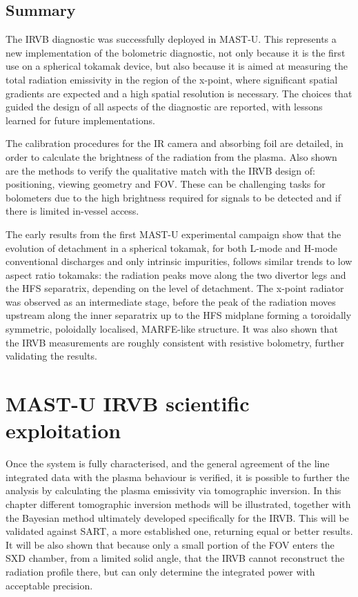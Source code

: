 \section{Summary}\label{Summary IRVB hardware}

The IRVB diagnostic was successfully deployed in MAST-U. This represents a new implementation of the bolometric diagnostic, not only because it is the first use on a spherical tokamak device, but also because it is aimed at measuring the total radiation emissivity in the region of the x-point, where significant spatial gradients are expected and a high spatial resolution is necessary. The choices that guided the design of all aspects of the diagnostic are reported, with lessons learned for future implementations.

The calibration procedures for the IR camera and absorbing foil are detailed, in order to calculate the brightness of the radiation from the plasma. Also shown are the methods to verify the qualitative match with the IRVB design of: positioning, viewing geometry and FOV. These can be challenging tasks for bolometers due to the high brightness required for signals to be detected and if there is limited in-vessel access.

The early results from the first MAST-U experimental campaign show that the evolution of detachment in a spherical tokamak, for both L-mode and H-mode conventional discharges and only intrinsic impurities, follows similar trends to low aspect ratio tokamaks: the radiation peaks move along the two divertor legs and the HFS separatrix, depending on the level of detachment. The x-point radiator was observed as an intermediate stage, before the peak of the radiation moves upstream along the inner separatrix up to the HFS midplane forming a toroidally symmetric, poloidally localised, MARFE-like structure. It was also shown that the IRVB measurements are roughly consistent with resistive bolometry, further validating the results.




\chapter{MAST-U IRVB scientific exploitation}\label{chapter2.5}

Once the system is fully characterised, and the general agreement of the line integrated data with the plasma behaviour is verified, it is possible to further the analysis by calculating the plasma emissivity via tomographic inversion. In this chapter different tomographic inversion methods will be illustrated, together with the Bayesian method ultimately developed specifically for the IRVB. This will be validated against SART, a more established one, returning equal or better results. It will be also shown that because only a small portion of the FOV enters the SXD chamber, from a limited solid angle, that the IRVB cannot reconstruct the radiation profile there, but can only determine the integrated power with acceptable precision.

